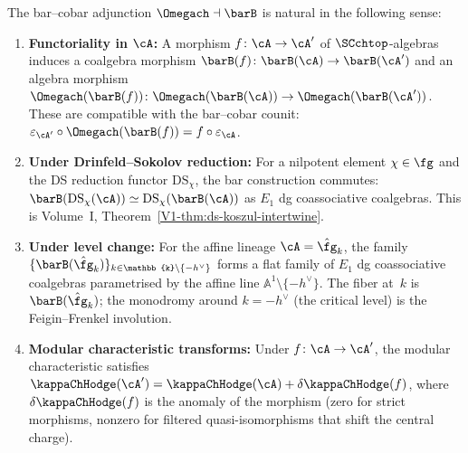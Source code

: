 \begin{proposition}
\label{prop:bar-cobar-naturality}
The bar--cobar adjunction $\Omegach \dashv \barB$ is natural in the
following sense:
\begin{enumerate}[label=\textup{(\roman*)}]
\item \textbf{Functoriality in $\cA$:} A morphism
 $f\colon \cA \to \cA'$ of $\SCchtop$-algebras induces a coalgebra
 morphism $\barB(f)\colon \barB(\cA) \to \barB(\cA')$ and an algebra
 morphism
 $\Omegach(\barB(f))\colon
 \Omegach(\barB(\cA)) \to \Omegach(\barB(\cA'))$.
 These are compatible with the bar--cobar counit:
 $\varepsilon_{\cA'} \circ \Omegach(\barB(f)) = f \circ \varepsilon_{\cA}$.

\item \textbf{Under Drinfeld--Sokolov reduction:} For a nilpotent
 element $\chi \in \fg$ and the DS reduction functor
 $\mathrm{DS}_\chi$, the bar construction commutes:
 $\barB(\mathrm{DS}_\chi(\cA))
 \simeq \mathrm{DS}_\chi(\barB(\cA))$ as $E_1$ dg coassociative coalgebras.
 This is Volume~I, Theorem~\textup{\ref*{V1-thm:ds-koszul-intertwine}}.

\item \textbf{Under level change:} For the affine lineage
 $\cA = \hat{\fg}_k$, the family
 $\{\barB(\hat{\fg}_k)\}_{k \in \mathbb{k} \setminus \{-h^\vee\}}$
 forms a flat family of $E_1$ dg coassociative coalgebras parametrised by the
 affine line $\mathbb{A}^1 \setminus \{-h^\vee\}$. The fiber at~$k$
 is $\barB(\hat{\fg}_k)$; the monodromy around $k = -h^\vee$
 \textup{(}the critical level\textup{)} is the Feigin--Frenkel
 involution.

\item \textbf{Modular characteristic transforms:} Under
 $f\colon \cA \to \cA'$, the modular characteristic satisfies
 $\kappaChHodge(\cA') = \kappaChHodge(\cA) + \delta\kappaChHodge(f)$, where
 $\delta\kappaChHodge(f)$ is the anomaly of the morphism \textup{(}zero for
 strict morphisms, nonzero for filtered quasi-isomorphisms that shift
 the central charge\textup{)}.
\end{enumerate}
\end{proposition}

